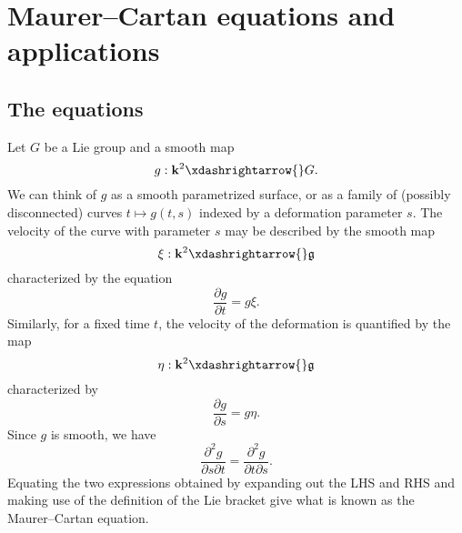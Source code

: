 \documentclass[reqno]{amsart} 
\begin{document}
\section{Maurer--Cartan equations and applications}
\label{sec:org6e14ee2}
\subsection{The equations\label{sec:cartan-maurer-eqn}}
\label{sec:org61f279c}
Let $G$ be a Lie group and a smooth map
\begin{equation*}
  g : \mathbf{k}^2 \xdashrightarrow{} G.
\end{equation*}
We can think of $g$ as a smooth parametrized surface, or as a family of (possibly disconnected) curves $t \mapsto g(t,s)$ indexed by a deformation parameter $s$.  The velocity of the curve with parameter $s$ may be described by the smooth map
\begin{equation*}
  \xi : \mathbf{k}^2 \xdashrightarrow{} \mathfrak{g}
\end{equation*}
characterized by the equation
\begin{equation*}
  \frac{\partial g}{\partial t} = g \xi.
\end{equation*}
Similarly, for a fixed time $t$, the velocity of the deformation is quantified by the map
\begin{equation*}
  \eta : \mathbf{k}^2 \xdashrightarrow{}\mathfrak{g}
\end{equation*}
characterized by
\begin{equation*}
  \frac{\partial g}{\partial s} = g \eta.
\end{equation*}
Since $g$ is smooth, we have
\begin{equation*}
  \frac{\partial ^2 g }{\partial s \partial t} = \frac{\partial ^2 g }{\partial t \partial s}.
\end{equation*}
Equating the two expressions obtained by expanding out the LHS and RHS and making use of the definition of the Lie bracket give what is known as the Maurer--Cartan equation.
\end{document}
